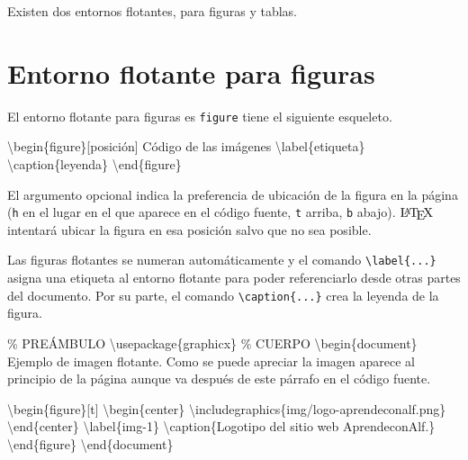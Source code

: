 \documentclass[
  a4paper,
]{scrreport}
\newenvironment{Shaded}{\begin{snugshade}}{\end{snugshade}}
\newcommand{\BuiltInTok}[1]{\textcolor[rgb]{0.00,0.23,0.31}{#1}}
\newcommand{\CommentTok}[1]{\textcolor[rgb]{0.37,0.37,0.37}{#1}}
\newcommand{\ExtensionTok}[1]{\textcolor[rgb]{0.00,0.23,0.31}{#1}}
\newcommand{\FunctionTok}[1]{\textcolor[rgb]{0.28,0.35,0.67}{#1}}
\newcommand{\KeywordTok}[1]{\textcolor[rgb]{0.00,0.23,0.31}{#1}}
\newcommand{\NormalTok}[1]{\textcolor[rgb]{0.00,0.23,0.31}{#1}}
\begin{document}
Existen dos entornos flotantes, para figuras y tablas.

\hypertarget{entorno-flotante-para-figuras}{%
\section{Entorno flotante para
figuras}\label{entorno-flotante-para-figuras}}

El entorno flotante para figuras es \texttt{figure} tiene el siguiente
esqueleto.

\begin{Shaded}
\begin{Highlighting}[]
\KeywordTok{\textbackslash{}begin}\NormalTok{\{}\ExtensionTok{figure}\NormalTok{\}[posición]}
\NormalTok{    Código de las imágenes}
\KeywordTok{\textbackslash{}label}\NormalTok{\{}\ExtensionTok{etiqueta}\NormalTok{\}}
\FunctionTok{\textbackslash{}caption}\NormalTok{\{leyenda\}}
\KeywordTok{\textbackslash{}end}\NormalTok{\{}\ExtensionTok{figure}\NormalTok{\}}
\end{Highlighting}
\end{Shaded}

El argumento opcional indica la preferencia de ubicación de la figura en
la página (\texttt{h} en el lugar en el que aparece en el código fuente,
\texttt{t} arriba, \texttt{b} abajo). \(\text{\LaTeX}\) intentará ubicar
la figura en esa posición salvo que no sea posible.

Las figuras flotantes se numeran automáticamente y el comando
\texttt{\textbackslash{}label\{...\}} asigna una etiqueta al entorno
flotante para poder referenciarlo desde otras partes del documento. Por
su parte, el comando \texttt{\textbackslash{}caption\{...\}} crea la
leyenda de la figura.

\begin{Shaded}
\begin{Highlighting}[]
\CommentTok{\% PREÁMBULO}
\BuiltInTok{\textbackslash{}usepackage}\NormalTok{\{}\ExtensionTok{graphicx}\NormalTok{\}}
\CommentTok{\% CUERPO}
\KeywordTok{\textbackslash{}begin}\NormalTok{\{}\ExtensionTok{document}\NormalTok{\}}
\NormalTok{Ejemplo de imagen flotante. Como se puede apreciar la imagen aparece al }
\NormalTok{principio de la página aunque va después de este párrafo en el código }
\NormalTok{fuente.}

\KeywordTok{\textbackslash{}begin}\NormalTok{\{}\ExtensionTok{figure}\NormalTok{\}[t]}
\KeywordTok{\textbackslash{}begin}\NormalTok{\{}\ExtensionTok{center}\NormalTok{\}}
\BuiltInTok{\textbackslash{}includegraphics}\NormalTok{\{}\ExtensionTok{img/logo{-}aprendeconalf.png}\NormalTok{\}}
\KeywordTok{\textbackslash{}end}\NormalTok{\{}\ExtensionTok{center}\NormalTok{\}}
\KeywordTok{\textbackslash{}label}\NormalTok{\{}\ExtensionTok{img{-}1}\NormalTok{\}}
\FunctionTok{\textbackslash{}caption}\NormalTok{\{Logotipo del sitio web AprendeconAlf.\}}
\KeywordTok{\textbackslash{}end}\NormalTok{\{}\ExtensionTok{figure}\NormalTok{\}}
\KeywordTok{\textbackslash{}end}\NormalTok{\{}\ExtensionTok{document}\NormalTok{\}}
\end{Highlighting}
\end{Shaded}
\end{document}
